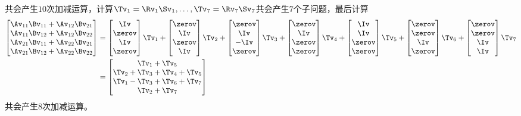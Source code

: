 \documentclass{ctexart}
\begin{document}
共会产生$10$次加减运算，计算$\Tv_1 = \Rv_1 \Sv_1, \ldots, \Tv_7 = \Rv_7 \Sv_7$共会产生$7$个子问题，最后计算
\begin{align*}
    \begin{bmatrix}
        \Av_{11} \Bv_{11} + \Av_{12} \Bv_{21} \\
        \Av_{11} \Bv_{12} + \Av_{12} \Bv_{22} \\
        \Av_{21} \Bv_{11} + \Av_{22} \Bv_{21} \\
        \Av_{21} \Bv_{12} + \Av_{22} \Bv_{22}
    \end{bmatrix}
     & =
    \begin{bmatrix}
        \Iv \\ \zerov \\ \Iv \\ \zerov
    \end{bmatrix} \Tv_1 +
    \begin{bmatrix}
        \zerov \\ \Iv \\ \zerov \\ \Iv
    \end{bmatrix} \Tv_2 +
    \begin{bmatrix}
        \zerov \\ \Iv \\ -\Iv \\ \zerov
    \end{bmatrix} \Tv_3 +
    \begin{bmatrix}
        \zerov \\ \Iv \\ \zerov \\ \zerov
    \end{bmatrix} \Tv_4 +
    \begin{bmatrix}
        \Iv \\ \Iv \\ \zerov \\ \zerov
    \end{bmatrix} \Tv_5 +
    \begin{bmatrix}
        \zerov \\ \zerov \\ \Iv \\ \zerov
    \end{bmatrix} \Tv_6 +
    \begin{bmatrix}
        \zerov \\ \zerov \\ \Iv \\ \Iv
    \end{bmatrix} \Tv_7 \\
     & =
    \begin{bmatrix}
        \Tv_1 + \Tv_5 \\ \Tv_2 + \Tv_3 + \Tv_4 + \Tv_5 \\ \Tv_1 - \Tv_3 + \Tv_6 + \Tv_7 \\ \Tv_2 + \Tv_7
    \end{bmatrix}
\end{align*}
共会产生$8$次加减运算。
\end{document}

